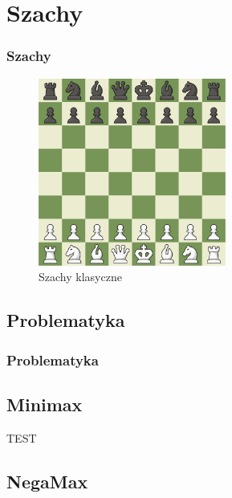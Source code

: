 \documentclass[polish,envcountsect,10pt]{beamer}
\begin{document}
    \section{Szachy}
        \begin{frame}
            \frametitle{Szachy}
            \begin{figure}[]
                \centering
                \includegraphics[width=0.55\textwidth]{images/chess.png}
                \caption{Szachy klasyczne}
            \end{figure}
        \end{frame}
        \subsection{Problematyka}
            \begin{frame}
               \frametitle{Problematyka} 
            \end{frame}
        \subsection{Minimax}
            \begin{frame}
                \begin{algorithm}[H]
                \caption{TEST}
                \end{algorithm}
            \end{frame}
        \subsection{NegaMax}
            \begin{frame}
                
            \end{frame}
\end{document}
